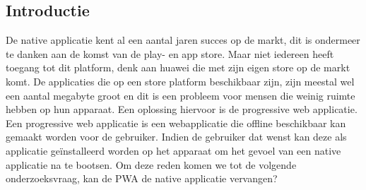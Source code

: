 \documentclass[a0,portrait]{a0poster}
\begin{document}
\begin{multicols}{2} %


\color{HoGentAccent1} %

\begin{abstract}
In dit onderzoek werd nagegaan in welke mate de progressive web applicatie de native applicatie kan vervangen. Om dit te testen werd er een zelfde applicatie gemaakt zowel in progressive web applicatie vorm als in native applicatie vorm. Eens deze applicaties klaar waren, werden deze getest op vlak van snelheid, gebruiksvriendelijkheid en de benodigde ruimte die de applicatie inneemt op het apparaat. Uit het onderzoek bleek dat de progressive web applicatie 90.67\% kleiner is dan de native applicatie maar niet sneller is. De native applicatie had een gemiddelde van 2.360 seconden terwijl de progressive web applicatie een gemiddelde van 2.693 seconden behaalde op het filteren van een menu.
\end{abstract}

\color{HoGentAccent1} 
\section*{Introductie}
\color{black}
\color{black}
De native applicatie kent al een aantal jaren succes op de markt, dit is ondermeer te danken aan de komst van de play- en app store. Maar niet iedereen heeft toegang tot dit platform, denk aan huawei die met zijn eigen store op de markt komt. De applicaties die op een store platform beschikbaar zijn, zijn meestal wel een aantal megabyte groot en  dit is een probleem voor mensen die weinig ruimte hebben op hun apparaat. Een oplossing hiervoor is de progressive web applicatie. Een progressive web applicatie is een webapplicatie die offline beschikbaar kan gemaakt worden voor de gebruiker. Indien de gebruiker dat wenst kan deze als applicatie geïnstalleerd worden op het apparaat om het gevoel van een native applicatie na te bootsen. Om deze reden komen we tot de volgende onderzoeksvraag,  kan de PWA de native applicatie vervangen?


\end{multicols}
\end{document}
